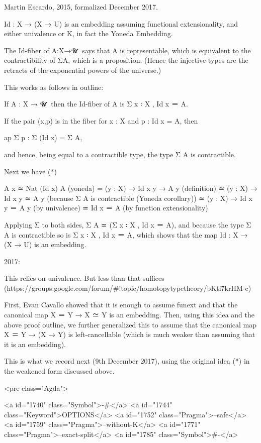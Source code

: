 Martin Escardo, 2015, formalized December 2017.

Id : X → (X → U) is an embedding assuming functional extensionality,
and either univalence or K, in fact the Yoneda Embedding.

The Id-fiber of A:X→𝓤 ̇ says that A is representable, which is
equivalent to the contractibility of ΣA, which is a
proposition. (Hence the injective types are the retracts of the
exponential powers of the universe.)

This works as follows in outline:

If A : X → 𝓤 ̇ then the Id-fiber of A is Σ x ꞉ X , Id x ＝ A.

If the pair (x,p) is in the fiber for x : X and p : Id x = A, then

   ap Σ p : Σ (Id x) = Σ A,

and hence, being equal to a contractible type, the type Σ A is
contractible.

Next we have (*)

 A x ≃ Nat (Id x) A             (yoneda)
     = (y : X) → Id x y → A y   (definition)
     ≃ (y : X) → Id x y ≃ A y   (because Σ A is contractible (Yoneda corollary))
     ≃ (y : X) → Id x y ＝ A y   (by univalence)
     ≃ Id x ＝ A                 (by function extensionality)

Applying Σ to both sides, Σ A ≃ (Σ x ꞉ X , Id x ＝ A), and because
the type Σ A is contractible so is Σ x ꞉ X , Id x ＝ A, which shows
that the map Id : X → (X → U) is an embedding.

2017:

This relies on univalence. But less than that suffices
(https://groups.google.com/forum/#!topic/homotopytypetheory/bKti7krHM-c)

First, Evan Cavallo showed that it is enough to assume funext and that
the canonical map X ＝ Y → X ≃ Y is an embedding. Then, using this idea
and the above proof outline, we further generalized this to assume
that the canonical map X ＝ Y → (X → Y) is left-cancellable (which is
much weaker than assuming that it is an embedding).

This is what we record next (9th December 2017), using the original
idea (*) in the weakened form discussed above.

<pre class="Agda">

<a id="1740" class="Symbol">{-#</a> <a id="1744" class="Keyword">OPTIONS</a> <a id="1752" class="Pragma">--safe</a> <a id="1759" class="Pragma">--without-K</a> <a id="1771" class="Pragma">--exact-split</a> <a id="1785" class="Symbol">#-}</a>

